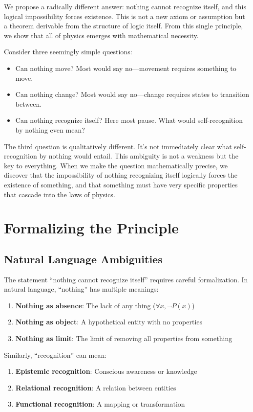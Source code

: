 \documentclass[12pt,a4paper]{article}
\begin{document}
We propose a radically different answer: nothing cannot recognize itself, and this logical impossibility forces existence. This is not a new axiom or assumption but a theorem derivable from the structure of logic itself. From this single principle, we show that all of physics emerges with mathematical necessity.

Consider three seemingly simple questions:
\begin{itemize}
\item Can nothing move? Most would say no---movement requires something to move.
\item Can nothing change? Most would say no---change requires states to transition between.
\item Can nothing recognize itself? Here most pause. What would self-recognition by nothing even mean?
\end{itemize}

The third question is qualitatively different. It's not immediately clear what self-recognition by nothing would entail. This ambiguity is not a weakness but the key to everything. When we make the question mathematically precise, we discover that the impossibility of nothing recognizing itself logically forces the existence of something, and that something must have very specific properties that cascade into the laws of physics.

\section{Formalizing the Principle}

\subsection{Natural Language Ambiguities}

The statement ``nothing cannot recognize itself'' requires careful formalization. In natural language, ``nothing'' has multiple meanings:

\begin{enumerate}
\item \textbf{Nothing as absence}: The lack of any thing ($\forall x, \neg P(x)$)
\item \textbf{Nothing as object}: A hypothetical entity with no properties
\item \textbf{Nothing as limit}: The limit of removing all properties from something
\end{enumerate}

Similarly, ``recognition'' can mean:
\begin{enumerate}
\item \textbf{Epistemic recognition}: Conscious awareness or knowledge
\item \textbf{Relational recognition}: A relation between entities
\item \textbf{Functional recognition}: A mapping or transformation
\end{enumerate}
\end{document}
